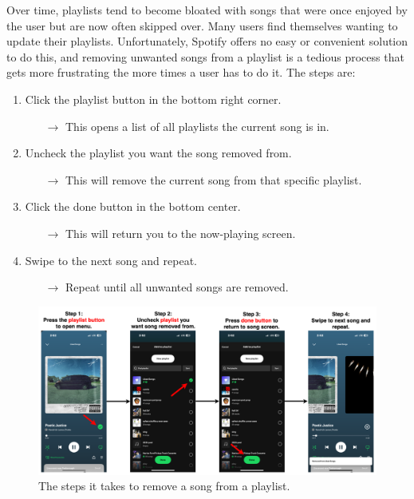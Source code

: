 \documentclass{article}
\begin{document}
Over time, playlists tend to become bloated with songs that were once enjoyed by the user but are now often skipped over. Many users find themselves wanting to update their playlists. Unfortunately, Spotify offers no easy or convenient solution to do this, and removing unwanted songs from a playlist is a tedious process that gets more frustrating the more times a user has to do it. The steps are:
\begin{enumerate}
  \item Click the playlist button in the bottom right corner.
  \begin{itemize}
    \item[$\rightarrow$] This opens a list of all playlists the current song is in.
  \end{itemize}

  \item Uncheck the playlist you want the song removed from.
  \begin{itemize}
    \item[$\rightarrow$] This will remove the current song from that specific playlist.
  \end{itemize}

  \item Click the done button in the bottom center.
  \begin{itemize}
    \item[$\rightarrow$] This will return you to the now-playing screen.
  \end{itemize}

  \item Swipe to the next song and repeat.
  \begin{itemize}
    \item[$\rightarrow$] Repeat until all unwanted songs are removed.
  \end{itemize}
\end{enumerate}

\begin{figure}[ht]
  \centering
  \includegraphics[width=\textwidth]{./spotify_diagram.png}
  \caption{The steps it takes to remove a song from a playlist.}
  \label{fig:spotify_diagram}
\end{figure}
\end{document}

